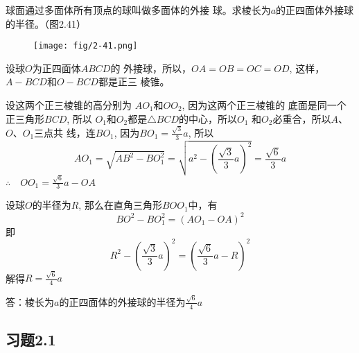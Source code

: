 \begin{example}
    球面通过多面体所有顶点的球叫做多面体的外接
球。求棱长为$a$的正四面体外接球的半径。（图2.41）
\end{example}

\begin{figure}[htp]
    \centering
\texttt{[image: fig/2-41.png]}
    \caption{}
\end{figure}

\begin{solution}
设球$O$为正四面体$ABCD$的
外接球，所以，$OA=OB=OC=OD$, 
这样，$A-BCD$和$O-BCD$都是正三
棱锥。

设这两个正三棱锥的高分别为
$AO_1$和$OO_2$, 因为这两个正三棱锥的
底面是同一个正三角形$BCD$, 所以
$O_1$和$O_2$都是$\triangle BCD$的中心，所以$O_1$
和$O_2$必重合，所以$A$、$O$、$O_1$三点共
线，连$BO_1$, 因为$BO_1=\frac{\sqrt{3}}{3}a$, 所以
\[AO_1=\sqrt{AB^2-BO_1^2}=\sqrt{a^2-\left(\frac{\sqrt{3}}{3}a\right)^2}=\frac{\sqrt{6}}{3}a\]
$\therefore\quad OO_1=\frac{\sqrt{6}}{3}a-OA$

设球$O$的半径为$R$, 那么在直角三角形$BOO_1$中，有
\[BO^2-BO_1^2=(AO_1-OA)^2\]
即\[R^2-\left(\frac{\sqrt{3}}{3}a\right)^2=\left(\frac{\sqrt{6}}{3}a-R\right)^2\]
解得$R=\frac{\sqrt{6}}{4}a$

答：棱长为$a$的正四面体的外接球的半径为$\frac{\sqrt{6}}{4}a$
\end{solution}

\subsection*{习题2.1}


